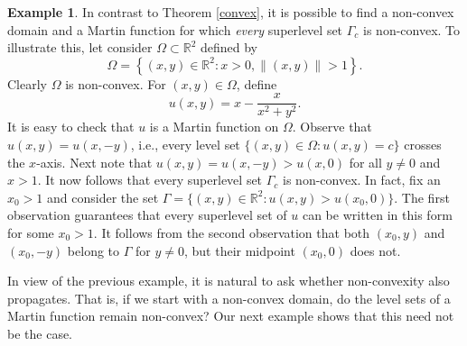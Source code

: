 \documentclass[11pt]{amsart}
\theoremstyle{definition}
\newtheorem{example}[thm]{Example}
\theoremstyle{remark}
\begin{document}
\begin{example}
In contrast to Theorem \ref{convex}, it is possible to find a non-convex domain and a Martin function for which \emph{every} superlevel set $\Gamma_c$ is non-convex. To illustrate this, let consider $\Omega\subset\mathbb{R}^2$ defined by $$\Omega= \left\{(x,y)\in\mathbb{R}^2: x > 0, \|(x,y)\|>1\right\}.$$
Clearly $\Omega$ is non-convex. For $(x,y)\in\Omega$, define $$u(x,y) = x- \dfrac{x}{x^2 + y^2}.$$ 
It is easy to check that $u$ is a Martin function on $\Omega$.
Observe that $u(x,y) = u(x,-y)$, i.e., every level set 
$\{(x,y)\in\Omega: u(x,y) = c\}$ crosses the $x$-axis. Next note that 
$u(x, y) = u(x, -y) > u(x,0)$ for all $y\neq 0$ and $x>1$. It now follows that every superlevel set $\Gamma_c$ is non-convex. In fact, fix an $x_0>1$ and consider the set $\Gamma = \{(x,y)\in\mathbb{R}^2: u(x,y) > u(x_0, 0)\}$. The first observation guarantees that every superlevel set of $u$ can be written in this form for some $x_0 >1$. It follows from the second observation that both
$(x_0,y)$ and $(x_0,-y)$ belong to $\Gamma$ for $y\neq 0$, but their midpoint $(x_0, 0)$ does not. 



\vspace{0.1in}

In view of the previous example, it is natural to ask whether non-convexity also propagates. That is, if we start with a non-convex domain, do the level sets of a Martin function remain non-convex? Our next example shows that this need not be the case.
\end{example}
\end{document}
